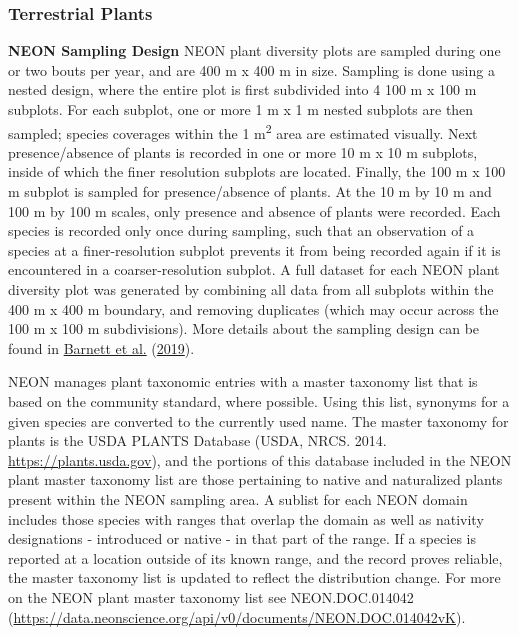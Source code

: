 \documentclass[
  12pt,
]{article}
\begin{document}
\hypertarget{terrestrial-plants}{%
\subsubsection{Terrestrial Plants}\label{terrestrial-plants}}

\textbf{NEON Sampling Design} NEON plant diversity plots are sampled during one or two bouts per year, and are 400 m x 400 m in size. Sampling is done using a nested design, where the entire plot is first subdivided into 4 100 m x 100 m subplots. For each subplot, one or more 1 m x 1 m nested subplots are then sampled; species coverages within the 1 m\textsuperscript{2} area are estimated visually. Next presence/absence of plants is recorded in one or more 10 m x 10 m subplots, inside of which the finer resolution subplots are located. Finally, the 100 m x 100 m subplot is sampled for presence/absence of plants. At the 10 m by 10 m and 100 m by 100 m scales, only presence and absence of plants were recorded. Each species is recorded only once during sampling, such that an observation of a species at a finer-resolution subplot prevents it from being recorded again if it is encountered in a coarser-resolution subplot. A full dataset for each NEON plant diversity plot was generated by combining all data from all subplots within the 400 m x 400 m boundary, and removing duplicates (which may occur across the 100 m x 100 m subdivisions). More details about the sampling design can be found in \protect\hyperlink{ref-barnett2019plant}{Barnett et al.} (\protect\hyperlink{ref-barnett2019plant}{2019}).

NEON manages plant taxonomic entries with a master taxonomy list that is based on the community standard, where possible. Using this list, synonyms for a given species are converted to the currently used name. The master taxonomy for plants is the USDA PLANTS Database (USDA, NRCS. 2014. \url{https://plants.usda.gov}), and the portions of this database included in the NEON plant master taxonomy list are those pertaining to native and naturalized plants present within the NEON sampling area. A sublist for each NEON domain includes those species with ranges that overlap the domain as well as nativity designations - introduced or native - in that part of the range. If a species is reported at a location outside of its known range, and the record proves reliable, the master taxonomy list is updated to reflect the distribution change. For more on the NEON plant master taxonomy list see NEON.DOC.014042 (\url{https://data.neonscience.org/api/v0/documents/NEON.DOC.014042vK}).
\end{document}
